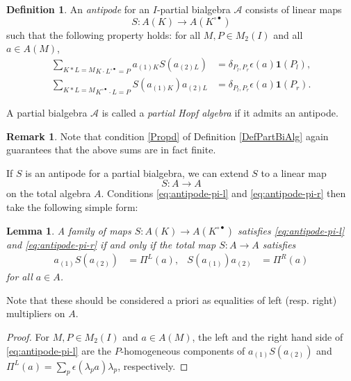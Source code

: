 \documentclass[11pt]{article}
\newcommand{\wmult}{\cdot}
\newcommand{\bmult}{*}
\newtheorem{Lem}[Theorem]{Lemma}
\theoremstyle{definition}
\newtheorem{Def}[Theorem]{Definition}
\newtheorem{Rem}[Theorem]{Remark}
\numberwithin{equation}{section}
\begin{document}
\begin{Def}\label{DefPartBiAlgAnt} An \emph{antipode} for an
  $I$-partial bialgebra $\mathscr{A}$ consists of linear
maps \[S:A(K)\rightarrow A(K^{\circ\bullet})\]
  such that the following property holds: for all $M,P\in M_2(I)$ and
  all $a\in A(M)$, \begin{align} \label{eq:antipode-pi-l}\underset{K\wmult
      L^{\circ\bullet}=P}{\sum_{K\bmult L = M}} a_{(1)K}S(a_{(2)L})&=
    \delta_{P_l,P_r}\epsilon(a)\mathbf{1}(P_l),
    \\ \label{eq:antipode-pi-r}
    \underset{K^{\circ\bullet}\wmult L=P}{\sum_{K\bmult L = M}}
    S(a_{(1)K})a_{(2)L}&=
    \delta_{P_l,P_r}\epsilon(a)\mathbf{1}(P_r).\end{align}

A partial bialgebra $\mathscr{A}$ is called a \emph{partial Hopf algebra} if it admits an antipode.
\end{Def} 

\begin{Rem} Note that condition \ref{Propd} of Definition \ref{DefPartBiAlg} again guarantees that the above sums are in fact finite.
\end{Rem}

If $S$ is an antipode for a partial bialgebra, we can extend $S$ to a
linear map \[S:A\rightarrow A\] on the total algebra $A$.  Conditions
\eqref{eq:antipode-pi-l} and \eqref{eq:antipode-pi-r} then take the
following simple form:
\begin{Lem} \label{lemma:antipode}
  A family of maps $S \colon A(K) \to A(K^{\circ\bullet})$ satisfies
  \eqref{eq:antipode-pi-l} and \eqref{eq:antipode-pi-r} if and only if
  the total map $S\colon A \to A$ satisfies 
  \begin{align} \label{eq:total-antipode}
 a_{(1)}S(a_{(2)}) &= \Pi^{L}(a), &
 S(a_{(1)})a_{(2)} &= \Pi^{R}(a)
  \end{align}
for all $a\in A$.
\end{Lem}

Note that these should be considered a priori as equalities of left (resp. right) multipliers on $A$.

\begin{proof}
For $M,P\in M_{2}(I)$ and $a\in A(M)$, the left and the right hand side  of \eqref{eq:antipode-pi-l} are the $P$-homogeneous components of $ a_{(1)}S(a_{(2)})$ and $\Pi^{L}(a)=\sum_{p} \epsilon(\lambda_{p}a)\lambda_{p}$, respectively.
\end{proof}
\end{document}
